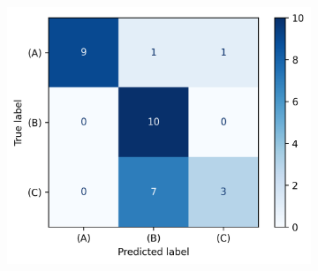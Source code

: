 \documentclass[energies,article,submit,pdftex,moreauthors]{Definitions/mdpi}
\begin{document}
\begin{figure}[t!]
    ~ 
    \begin{subfigure}[t]{0.3\textwidth}
        \centering
        \includegraphics[width=\linewidth]{images/confusion_matrix_multiclass_2}
        \caption{}
    \end{subfigure}


\end{figure}
\end{document}
